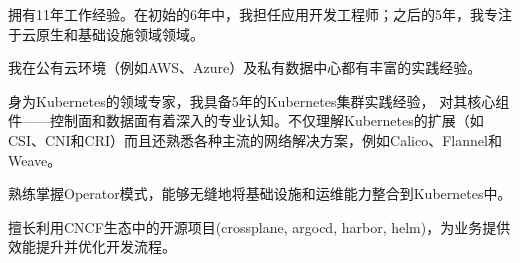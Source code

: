 

\begin{cvparagraph}

拥有11年工作经验。在初始的6年中，我担任应用开发工程师；之后的5年，我专注于云原生和基础设施领域领域。

我在公有云环境（例如AWS、Azure）及私有数据中心都有丰富的实践经验。

身为Kubernetes的领域专家，我具备5年的Kubernetes集群实践经验， 对其核心组件——控制面和数据面有着深入的专业认知。不仅理解Kubernetes的扩展（如CSI、CNI和CRI）而且还熟悉各种主流的网络解决方案，例如Calico、Flannel和Weave。

熟练掌握Operator模式，能够无缝地将基础设施和运维能力整合到Kubernetes中。

擅长利用CNCF生态中的开源项目(crossplane, argocd, harbor, helm)，为业务提供效能提升并优化开发流程。

\end{cvparagraph}



